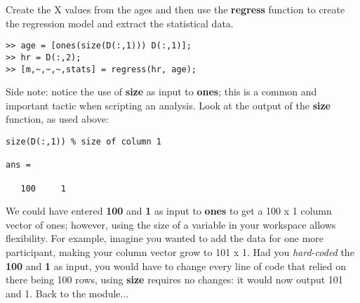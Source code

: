 \documentclass[12pt,a4paper]{article}
\begin{document}
Create the X values from the ages and then use the \textbf{regress} function to create the regression model and extract the statistical data.
\begin{lstlisting}[style=Matlab-editor]
>> age = [ones(size(D(:,1))) D(:,1)];
>> hr = D(:,2);
>> [m,~,~,~,stats] = regress(hr, age);
\end{lstlisting}
Side note: notice the use of \textbf{size} as input to \textbf{ones}; this is a common and important tactic when scripting an analysis.
Look at the output of the \textbf{size} function, as used above:
\begin{lstlisting}[style=Matlab-editor]
size(D(:,1)) % size of column 1

ans = 

   100     1
\end{lstlisting}
We could have entered \textbf{100} and \textbf{1} as input to \textbf{ones} to get a 100 x 1 column vector of ones; however, using the size of a variable in your workspace allows flexibility.
For example, imagine you wanted to add the data for one more participant, making your column vector grow to 101 x 1.
Had you \emph{hard-coded} the \textbf{100} and \textbf{1} as input, you would have to change every line of code that relied on there being 100 rows, using \textbf{size} requires no changes: it would now output 101 and 1.
Back to the module...
\end{document}
